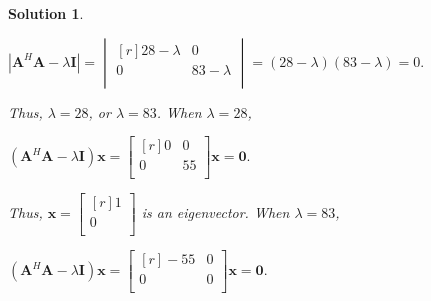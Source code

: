 \documentclass{article}
\newtheorem*{solution}{Solution}
\begin{document}
\begin{solution}
    \begin{center}
        \begin{math}
            \left\lvert \mathbf{A}^{H}\mathbf{A} - \lambda\mathbf{I} \right\rvert = 
                \begin{vmatrix*}[r]
                        28-\lambda & 0 \\
                        0 & 83-\lambda \\
                \end{vmatrix*}
                =(28 - \lambda)(83 - \lambda)= 0.
        \end{math}
    \end{center}

    Thus, $\lambda = 28$, or $\lambda = 83$. When $\lambda = 28$,

    \begin{center}
        \begin{math}
            (\mathbf{A}^{H}\mathbf{A} - \lambda\mathbf{I})\mathbf{x} = 
                \begin{bmatrix*}[r]
                        0 & 0 \\
                        0 & 55 \\
                \end{bmatrix*} \mathbf{x}
                =\mathbf{0}.
        \end{math}
    \end{center}

    Thus, $\mathbf{x} =                 
    \begin{bmatrix*}[r]
        1 \\
        0 \\
    \end{bmatrix*}$ is an eigenvector. When $\lambda = 83$,

    \begin{center}
        \begin{math}
            (\mathbf{A}^{H}\mathbf{A} - \lambda\mathbf{I})\mathbf{x} = 
                \begin{bmatrix*}[r]
                        -55 & 0 \\
                        0 & 0 \\
                \end{bmatrix*} \mathbf{x}
                =\mathbf{0}.
        \end{math}
    \end{center}


\end{solution}
\end{document}
